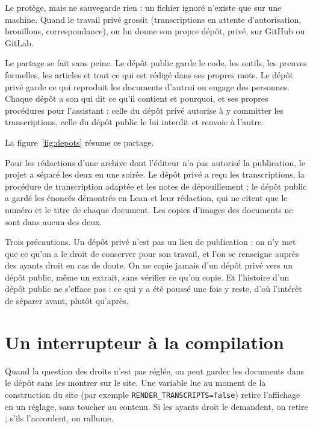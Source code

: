 Le  protège, mais ne sauvegarde rien : un fichier ignoré n'existe que
sur une machine. Quand le travail privé grossit (transcriptions en attente d'autorisation,
brouillons, correspondance), on lui donne son propre dépôt, privé, sur GitHub ou GitLab.

Le partage se fait sans peine. Le dépôt public garde le code, les outils, les preuves formelles,
les articles et tout ce qui est rédigé dans ses propres mots. Le dépôt privé garde ce qui
reproduit les documents d'autrui ou engage des personnes. Chaque dépôt a son 
qui dit ce qu'il contient et pourquoi, et ses propres procédures pour l'assistant : celle du
dépôt privé autorise à y committer les transcriptions, celle du dépôt public le lui interdit
et renvoie à l'autre.

La figure~\ref{fig:depots} résume ce partage.



\begin{exemple}
Pour les rédactions d'une archive dont l'éditeur n'a pas autorisé la publication, le
projet a séparé les deux en une soirée. Le dépôt privé a reçu les transcriptions, la
procédure de transcription adaptée et les notes de dépouillement ; le dépôt public a gardé
les énoncés démontrés en Lean et leur rédaction, qui ne citent que le numéro et le titre de
chaque document. Les copies d'images des documents ne sont dans aucun des deux.
\end{exemple}

Trois précautions. Un dépôt privé n'est pas un lieu de publication : on n'y met que ce qu'on
a le droit de conserver pour son travail, et l'on se renseigne auprès des ayants droit en
cas de doute. On ne copie jamais d'un dépôt privé vers un dépôt public, même un extrait,
sans vérifier ce qu'on copie. Et l'histoire d'un dépôt public ne s'efface pas : ce qui y a
été poussé une fois y reste, d'où l'intérêt de séparer avant, plutôt qu'après.

\section{Un interrupteur à la compilation}

Quand la question des droits n'est pas réglée, on peut garder les documents dans le dépôt
sans les montrer sur le site. Une variable lue au moment de la construction du site (par
exemple \texttt{RENDER\_TRANSCRIPTS=false}) retire l'affichage en un réglage, sans toucher
au contenu. Si les ayants droit le demandent, on retire ; s'ils l'accordent, on rallume.

